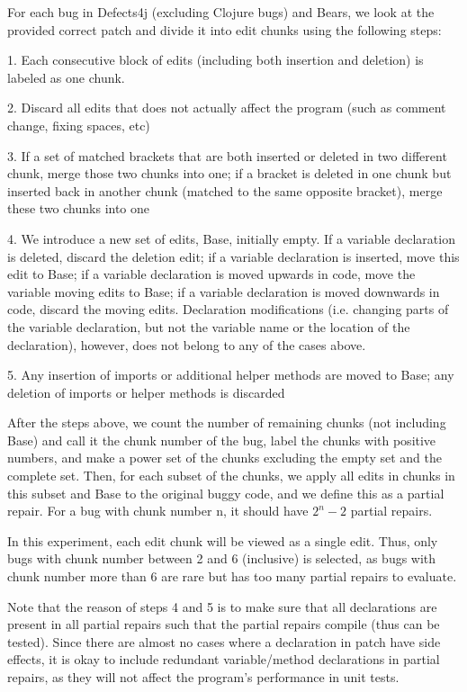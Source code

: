 \documentclass[sigconf, timestamp-false, anonymous=true]{acmart}
\begin{document}
For each bug in Defects4j (excluding Clojure bugs) and Bears, we look at the provided correct patch and divide it into edit chunks using the following steps:

1. Each consecutive block of edits (including both insertion and deletion) is labeled as one chunk.

2. Discard all edits that does not actually affect the program (such as comment change, fixing spaces, etc)

3. If a set of matched brackets that are both inserted or deleted in two different chunk, merge those two chunks into one; if a bracket is deleted in one chunk but inserted back in another chunk (matched to the same opposite bracket), merge these two chunks into one

4. We introduce a new set of edits, Base, initially empty. If a variable declaration is deleted, discard the deletion edit; if a variable declaration is inserted, move this edit to Base; if a variable declaration is moved upwards in code, move the variable moving edits to Base; if a variable declaration is moved downwards in code, discard the moving edits. Declaration modifications (i.e. changing parts of the variable declaration, but not the variable name or the location of the declaration), however, does not belong to any of the cases above.

5. Any insertion of imports or additional helper methods are moved to Base; any deletion of imports or helper methods is discarded

After the steps above, we count the number of remaining chunks (not including Base) and call it the chunk number of the bug, label the chunks with positive numbers, and make a power set of the chunks excluding the empty set and the complete set. Then, for each subset of the chunks, we apply all edits in chunks in this subset and Base to the original buggy code, and we define this as a partial repair. For a bug with chunk number n, it should have $2^n-2$ partial repairs. 

In this experiment, each edit chunk will be viewed as a single edit. Thus, only bugs with chunk number between 2 and 6 (inclusive) is selected, as bugs with chunk number more than 6 are rare but has too many partial repairs to evaluate.

Note that the reason of steps 4 and 5 is to make sure that all declarations are present in all partial repairs such that the partial repairs compile (thus can be tested). Since there are almost no cases where a declaration in patch have side effects, it is okay to include redundant variable/method declarations in partial repairs, as they will not affect the program's performance in unit tests. 
\end{document}

